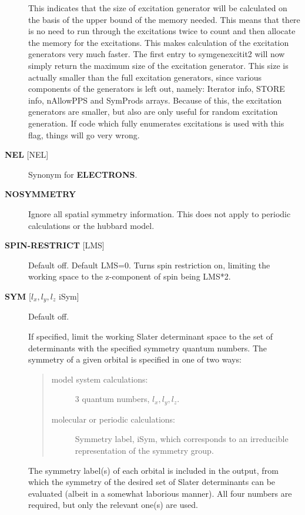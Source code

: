 \documentclass[openany,a4paper,10pt]{manual}
\begin{document}
\begin{description}
This indicates that the size of excitation generator will be calculated on the basis of the upper bound of the memory
needed. This means that there is no need to run through the excitations twice to count and then allocate the memory
for the excitations. This makes calculation of the excitation generators very much faster. The first entry to
symgenexcitit2 will now simply return the maximum size of the excitation
generator. This size is actually smaller than the full excitation generators, since various components of the
generators is left out, namely: Iterator info, STORE info, nAllowPPS and SymProds arrays. Because of this, the
excitation generators are smaller, but also are only useful for random excitation generation. If code which fully
enumerates excitations is used with this flag, things will go very wrong.

\item[\textbf{NEL} {[}NEL{]}]
Synonym for \textbf{ELECTRONS}.

\item[\textbf{NOSYMMETRY}]
Ignore all spatial symmetry information. This does not apply to
periodic calculations or the hubbard model.

\item[\textbf{SPIN-RESTRICT} {[}LMS{]}]
Default off.  Default LMS=0.  Turns spin restriction on, limiting
the working space to the z-component of spin being LMS*2.

\item[\textbf{SYM} {[}$l_x,l_y,l_z$ iSym{]}]
Default off.

If specified, limit the working Slater determinant space to the set
of determinants with the specified symmetry quantum numbers. The symmetry
of a given orbital is specified in one of two ways:
\begin{quote}
\begin{description}
\item[model system calculations:]
3 quantum numbers, $l_x,l_y,l_z$.

\item[molecular or periodic calculations:]
Symmetry label, iSym, which corresponds to an irreducible
representation of the symmetry group.

\end{description}
\end{quote}

The symmetry label(s) of each orbital is included in the output,
from which the symmetry of the desired set of Slater determinants
can be evaluated (albeit in a somewhat laborious manner). All four
numbers are required, but only the relevant one(s) are used.


\end{description}
\end{document}
